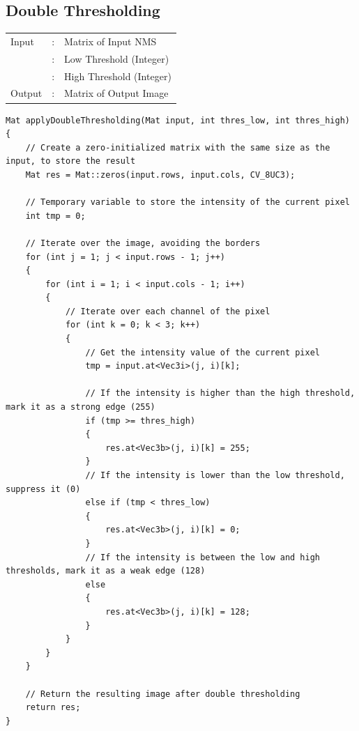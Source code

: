 \documentclass[12pt,a4paper]{report}
\begin{document}
\subsection{Double Thresholding}
\begin{tabular}{lll}
  Input  & : & Matrix of Input NMS  \\
         & : & Low Threshold (Integer)  \\
         & : & High Threshold (Integer)  \\
  Output & : & Matrix of Output Image \\
\end{tabular}
\begin{lstlisting}
Mat applyDoubleThresholding(Mat input, int thres_low, int thres_high)
{
    // Create a zero-initialized matrix with the same size as the input, to store the result
    Mat res = Mat::zeros(input.rows, input.cols, CV_8UC3);

    // Temporary variable to store the intensity of the current pixel
    int tmp = 0;

    // Iterate over the image, avoiding the borders
    for (int j = 1; j < input.rows - 1; j++)
    {
        for (int i = 1; i < input.cols - 1; i++)
        {
            // Iterate over each channel of the pixel
            for (int k = 0; k < 3; k++)
            {
                // Get the intensity value of the current pixel
                tmp = input.at<Vec3i>(j, i)[k];

                // If the intensity is higher than the high threshold, mark it as a strong edge (255)
                if (tmp >= thres_high)
                {
                    res.at<Vec3b>(j, i)[k] = 255;
                }
                // If the intensity is lower than the low threshold, suppress it (0)
                else if (tmp < thres_low)
                {
                    res.at<Vec3b>(j, i)[k] = 0;
                }
                // If the intensity is between the low and high thresholds, mark it as a weak edge (128)
                else
                {
                    res.at<Vec3b>(j, i)[k] = 128;
                }
            }
        }
    }

    // Return the resulting image after double thresholding
    return res;
}
\end{lstlisting}
\end{document}
